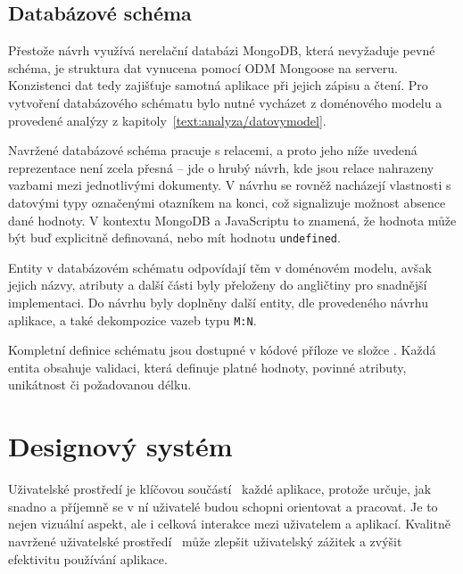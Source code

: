 \subsection{Databázové schéma}

Přestože návrh využívá nerelační databázi MongoDB, která nevyžaduje pevné schéma, je struktura dat vynucena pomocí ODM Mongoose na serveru.
Konzistenci dat tedy zajišťuje samotná aplikace při jejich zápisu a čtení. 
Pro vytvoření databázového schématu bylo nutné vycházet z doménového modelu a provedené analýzy z kapitoly~\ref{text:analyza/datovymodel}.

Navržené databázové schéma pracuje s relacemi, a proto jeho níže uvedená reprezentace není zcela přesná -- jde o hrubý návrh, kde jsou relace nahrazeny vazbami mezi jednotlivými dokumenty. 
V návrhu se rovněž nacházejí vlastnosti s datovými typy označenými otazníkem na konci, což signalizuje možnost absence dané hodnoty.
V kontextu MongoDB a JavaScriptu to znamená, že hodnota může být buď explicitně definovaná, nebo mít hodnotu \texttt{undefined}.

Entity v databázovém schématu odpovídají těm v doménovém modelu, avšak jejich názvy, atributy a další části byly přeloženy do angličtiny pro snadnější implementaci. 
Do návrhu byly doplněny další entity, dle provedeného návrhu aplikace, a také dekompozice vazeb typu \texttt{M:N}. 

Kompletní definice schématu jsou dostupné v kódové příloze ve složce . 
Každá entita obsahuje validaci, která definuje platné hodnoty, povinné atributy, unikátnost či požadovanou délku.


\section{Designový systém}

Uživatelské prostředí je klíčovou součástí~\cite{kholmatova_2017} každé aplikace, protože určuje, jak snadno a příjemně se v ní uživatelé budou schopni orientovat a pracovat. 
Je to nejen vizuální aspekt, ale i celková interakce mezi uživatelem a aplikací. 
Kvalitně navržené uživatelské prostředí~\cite{tidwell_2019} může zlepšit uživatelský zážitek a zvýšit efektivitu používání aplikace.

